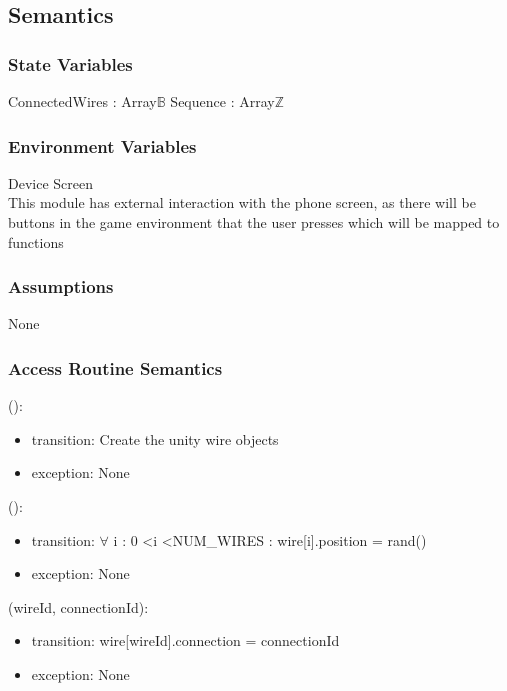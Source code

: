 \documentclass[12pt, titlepage]{article}
\begin{document}
\subsection{Semantics}

\subsubsection{State Variables}

ConnectedWires : Array\textlangle$\mathds{B}$\textrangle \newline
Sequence : Array\textlangle$\mathds{Z}$\textrangle

\subsubsection{Environment Variables}

Device Screen\\
This module has external interaction with the phone screen, as there will be buttons in the game environment that the user presses which will be mapped to functions

\subsubsection{Assumptions}

None

\subsubsection{Access Routine Semantics}

():
\begin{itemize}
\item transition: Create the unity wire objects
\item exception: None
\end{itemize}

():
\begin{itemize}
\item transition: $\forall$ i : 0 \textless i \textless NUM\_WIRES : wire[i].position = rand()
\item exception: None
\end{itemize}

(wireId, connectionId):
\begin{itemize}
\item transition: wire[wireId].connection = connectionId
\item exception: None
\end{itemize}
\end{document}
